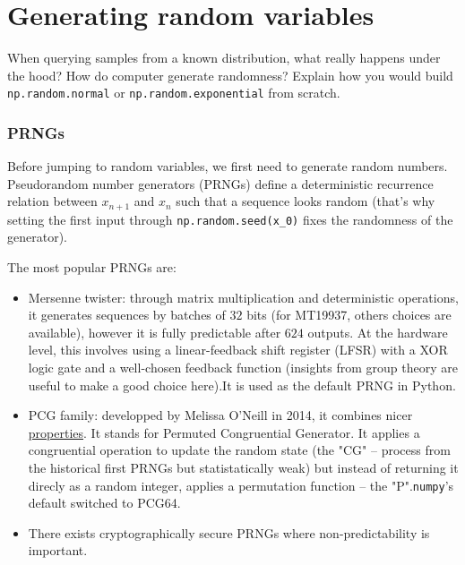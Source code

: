 \section{Generating random variables}

\begin{tcolorbox}[width=\linewidth, sharp corners=all, colback=white!95!black]
    When querying samples from a known distribution, what really happens under the hood? How do computer generate randomness? Explain how you would build \texttt{np.random.normal} or \texttt{np.random.exponential} from scratch.
\end{tcolorbox}

\subsubsection*{PRNGs}

Before jumping to random variables, we first need to generate random numbers. Pseudorandom number generators (PRNGs) define a deterministic recurrence relation between $x_{n+1}$ and $x_n$ such that a sequence looks random (that's why setting the first input through \texttt{np.random.seed(x_0)} fixes the randomness of the generator).\newline


The most popular PRNGs are:
\begin{itemize}
    \item Mersenne twister: through matrix multiplication and deterministic operations, it generates sequences by batches of $32$ bits (for MT19937, others choices are available), however it is fully predictable after $624$ outputs. \newline At the hardware level, this involves using a linear-feedback shift register (LFSR) with a XOR logic gate and a well-chosen feedback function (insights from group theory are useful to make a good choice here).\newline It is used as the default PRNG in Python.
    \item PCG family: developped by Melissa O'Neill in 2014, it combines nicer \href{https://www.pcg-random.org/}{properties}. It stands for Permuted Congruential Generator. It applies a congruential operation to update the random state (the "CG" -- process from the historical first PRNGs but statistatically weak) but instead of returning it direcly as a random integer, applies a permutation function -- the "P".\newline \texttt{numpy}'s default switched to PCG64.
    \item There exists cryptographically secure PRNGs where non-predictability is important.
\end{itemize}


